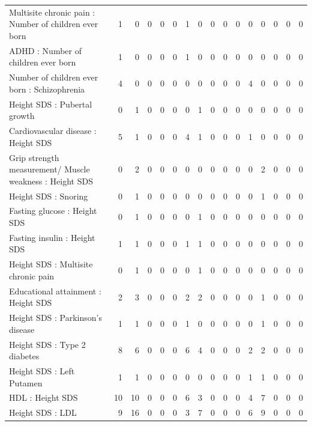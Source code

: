 \begin{table}[ht]
\begin{tabular}{lrrrrrrrrrrrrrrr}
  Multisite chronic pain : Number of children ever born  &   1 &   0 &   0 &   0 &   0 &   1 &   0 &   0 &   0 &   0 &   0 &   0 &   0 &   0 &   0 \\ 
  ADHD : Number of children ever born  &   1 &   0 &   0 &   0 &   0 &   1 &   0 &   0 &   0 &   0 &   0 &   0 &   0 &   0 &   0 \\ 
  Number of children ever born  : Schizophrenia &   4 &   0 &   0 &   0 &   0 &   0 &   0 &   0 &   0 &   0 &   4 &   0 &   0 &   0 &   0 \\ 
  Height SDS : Pubertal growth  &   0 &   1 &   0 &   0 &   0 &   0 &   1 &   0 &   0 &   0 &   0 &   0 &   0 &   0 &   0 \\ 
  Cardiovascular disease : Height SDS &   5 &   1 &   0 &   0 &   0 &   4 &   1 &   0 &   0 &   0 &   1 &   0 &   0 &   0 &   0 \\ 
  Grip strength measurement/ Muscle weakness : Height SDS &   0 &   2 &   0 &   0 &   0 &   0 &   0 &   0 &   0 &   0 &   0 &   2 &   0 &   0 &   0 \\ 
  Height SDS : Snoring &   0 &   1 &   0 &   0 &   0 &   0 &   0 &   0 &   0 &   0 &   0 &   1 &   0 &   0 &   0 \\ 
  Fasting glucose : Height SDS &   0 &   1 &   0 &   0 &   0 &   0 &   1 &   0 &   0 &   0 &   0 &   0 &   0 &   0 &   0 \\ 
  Fasting insulin : Height SDS &   1 &   1 &   0 &   0 &   0 &   1 &   1 &   0 &   0 &   0 &   0 &   0 &   0 &   0 &   0 \\ 
  Height SDS : Multisite chronic pain &   0 &   1 &   0 &   0 &   0 &   0 &   1 &   0 &   0 &   0 &   0 &   0 &   0 &   0 &   0 \\ 
  Educational attainment : Height SDS &   2 &   3 &   0 &   0 &   0 &   2 &   2 &   0 &   0 &   0 &   0 &   1 &   0 &   0 &   0 \\ 
  Height SDS : Parkinson's disease &   1 &   1 &   0 &   0 &   0 &   1 &   0 &   0 &   0 &   0 &   0 &   1 &   0 &   0 &   0 \\ 
  Height SDS : Type 2 diabetes &   8 &   6 &   0 &   0 &   0 &   6 &   4 &   0 &   0 &   0 &   2 &   2 &   0 &   0 &   0 \\ 
  Height SDS : Left Putamen &   1 &   1 &   0 &   0 &   0 &   0 &   0 &   0 &   0 &   0 &   1 &   1 &   0 &   0 &   0 \\ 
  HDL : Height SDS &  10 &  10 &   0 &   0 &   0 &   6 &   3 &   0 &   0 &   0 &   4 &   7 &   0 &   0 &   0 \\ 
  Height SDS : LDL &   9 &  16 &   0 &   0 &   0 &   3 &   7 &   0 &   0 &   0 &   6 &   9 &   0 &   0 &   0 \\ 

\end{tabular}
\end{table}
